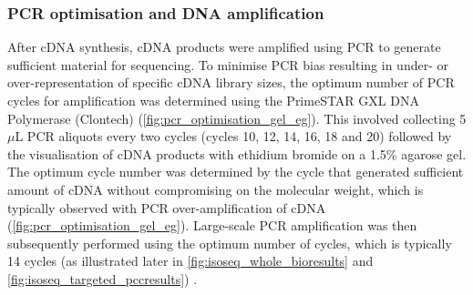 \clearpage
\subsubsection{PCR optimisation and DNA amplification}\label{ch: pcr_optimisation}
After cDNA synthesis, cDNA products were amplified using PCR to generate sufficient material for sequencing. To minimise PCR bias resulting in under- or over-representation of specific cDNA library sizes, the optimum number of PCR cycles for amplification was determined using the PrimeSTAR GXL DNA Polymerase (Clontech) (\cref{fig:pcr_optimisation_gel_eg}). This involved collecting 5$\mu$L PCR aliquots every two cycles (cycles 10, 12, 14, 16, 18 and 20) followed by the visualisation of cDNA products with ethidium bromide on a 1.5\% agarose gel. The optimum cycle number was determined by the cycle that generated sufficient amount of cDNA without compromising on the molecular weight, which is typically observed with PCR over-amplification of cDNA (\cref{fig:pcr_optimisation_gel_eg}). Large-scale PCR amplification was then subsequently performed using the optimum number of cycles, which is typically 14 cycles (as illustrated later in \cref{fig:isoseq_whole_bioresults} and \cref{fig:isoseq_targeted_pccresults}) . 

